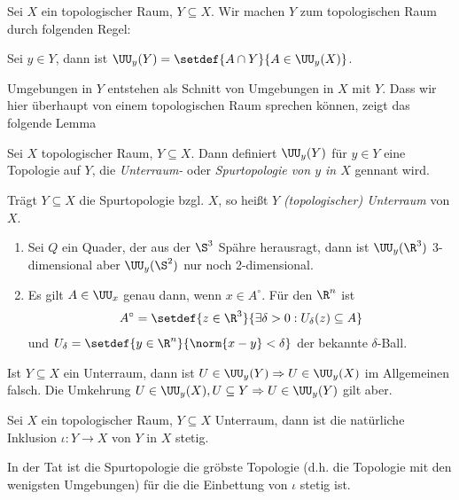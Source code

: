 \begin{defn}
\label{defn:0.3.4}
Sei $X$ ein topologischer Raum, $Y\subseteq X$. Wir machen $Y$ zum
topologischen Raum durch folgenden Regel:

Sei $y\in Y$, dann ist $\UU_y(Y) = \setdef{A\cap Y}{A\in \UU_y(X)}$.\fishhere
\end{defn}

Umgebungen in $Y$ entstehen als Schnitt von Umgebungen in $X$ mit $Y$. Dass wir
hier überhaupt von einem topologischen Raum sprechen können, zeigt das folgende
Lemma

\begin{lem}
\label{prop:0.3.5}
Sei $X$ topologischer Raum, $Y\subseteq X$. Dann definiert $\UU_y(Y)$ für $y\in
Y$ eine Topologie auf $Y$, die \emph{Unterraum-} oder \emph{Spurtopologie von
$y$ in $X$} gennant wird.

Trägt $Y\subseteq X$ die Spurtopologie bzgl. $X$, so heißt $Y$
\emph{(topologischer) Unterraum} von $X$.\fishhere
\end{lem}

\begin{bspn}
\begin{enumerate}
  \item Sei $Q$ ein Quader, der aus der $\S^3$ Spähre herausragt,
  dann ist $\UU_y(\R^3)$ 3-dimensional aber $\UU_y(\S^2)$ nur noch
  2-dimensional.
  \item Es gilt $A\in \UU_x$ genau dann, wenn $x\in A^\circ$. Für den $\R^n$
  ist
  \begin{align*}
  A^\circ = \setdef{z\in\R^3}{\exists \delta > 0 : U_\delta(z)\subseteq A}
  \end{align*}
  und $U_\delta = \setdef{y\in\R^n}{\norm{x-y} < \delta}$ der bekannte
  $\delta$-Ball.\bsphere
\end{enumerate}
\end{bspn}

\begin{bemn}[Vorsicht:]
Ist $Y\subseteq X$ ein Unterraum, dann ist $U\in \UU_y(Y) \Rightarrow U\in
\UU_y(X)$ im Allgemeinen falsch. Die Umkehrung $U\in \UU_y(X), U\subseteq Y
\Rightarrow U\in \UU_y(Y)$ gilt aber.\maphere
\end{bemn}

\begin{lem}
\label{prop:0.3.6}
Sei $X$ ein topologischer Raum, $Y\subseteq X$ Unterraum, dann ist die
natürliche Inklusion $\iota: Y\to X$ von $Y$ in $X$ stetig.

In der Tat ist die Spurtopologie die gröbste Topologie (d.h. die Topologie mit
den wenigsten Umgebungen) für die die Einbettung von $\iota$ stetig
ist.\fishhere
\end{lem}

